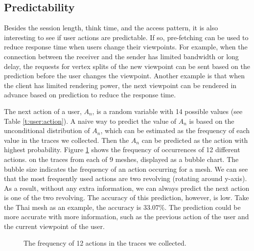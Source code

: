 \subsection{Predictability}
\label{ss:user:predictability}
Besides the session length, think time, and the access pattern,
it is also interesting to see if user actions are predictable. 
If so, pre-fetching can be used to reduce response time when
users change their viewpoints. For example, when the connection between the 
receiver and the sender has limited bandwidth
or long delay, the requests for vertex splits of the new viewpoint 
can be sent based on the prediction before the user changes the viewpoint.
Another example is that when the client has limited
rendering power, the next viewpoint can be rendered
in advance based on prediction to reduce the response time. 

The next action of a user, $A_n$, is a random variable with 14 possible values
(see Table \ref{t:user:action}). 
A naive way to predict the value of $A_n$ is based on the unconditional distribution 
of $A_n$, which can be estimated as the frequency of each value in the traces
we collected.  
Then the $A_n$ can be predicted as the action with highest probability.
Figure \ref{f:user:frequency}
shows the frequency of occurrences of 12 different actions.
on the traces from each of 9 meshes,
displayed as a bubble chart. 
The bubble size indicates the frequency of an action occurring for a mesh.
We can see that the most frequently used actions are two revolving (rotating around y-axis). 
As a result, without any extra information, we can always predict the next action is 
one of the two revolving.
The accuracy of this prediction, however, is low. 
Take the Thai mesh as an example,
the accuracy is $33.07\%$. %
The prediction could be more accurate with more information,
such as the previous action of the user and the current viewpoint of the user.
\begin{figure}[htdp!]
    \centering
    \caption{The frequency of 12 actions in the traces we collected.}
    \label{f:user:frequency}
\end{figure}

